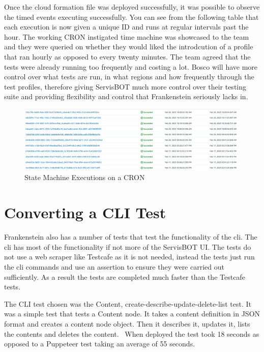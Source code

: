 \documentclass[12pt,a4paper,titlepage]{report}
\begin{document}
Once the cloud formation file was deployed successfully, it was possible to observe the timed events executing successfully. You can see from the following table 
that each execution is now given a unique ID and runs at regular intervals past the hour. The working CRON instigated time machine was showcased to the team and they were 
queried on whether they would liked the introdcution of a profile that ran hourly as opposed to every twenty minutes. The team agreed that the tests were already running too 
frequently and costing a lot. Bosco will have more control over what tests are run, in what regions and how frequently through the test profiles, therefore giving ServisBOT 
much more control over their testing suite and providing flexibility and control that Frankenstein seriously lacks in.

\begin{figure}[ht]
  \centering
  \includegraphics[width=15cm]{./diagrams/state_machine_cron_executions.png}
  \caption{State Machine Executions on a CRON }
 \end{figure}

 \section{Converting a CLI Test}
 Frankenstein also has a number of tests that test the functionality of the cli. The cli has most of the functionality if not more of the ServisBOT UI. The tests do not use a web scraper like Testcafe as it is not needed, instead the tests just run the cli commands and use an assertion to ensure they were carried out sufficiently. As a result the tests are completed much faster than the Testcafe tests.

The CLI test chosen was the Content, create-describe-update-delete-list test. It was a simple test that tests a Content node. It takes a content definition in JSON format and creates a content node object. Then it describes it, updates it, lists the contents and deletes the content. 
When deployed the test took 18 seconds as opposed to a Puppeteer test taking an average of 55 seconds.
\end{document}
